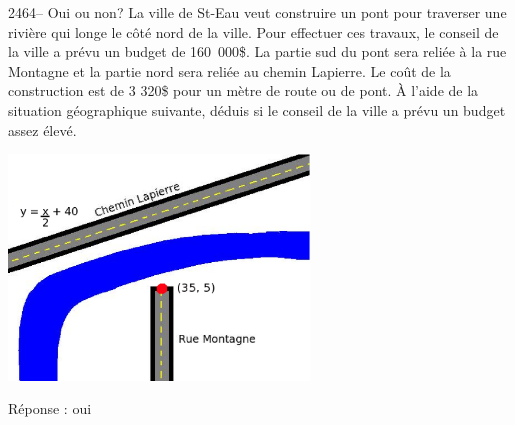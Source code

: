 \documentclass[letterpaper, 12pt]{article}
\begin{document}
2464-- Oui ou non? La ville de St-Eau veut construire un pont pour traverser une rivi\`ere qui longe le c\^ot\'e nord de la ville. Pour effectuer ces travaux, le conseil de la ville a pr\'evu un budget de \mbox{160 000\$}. La partie sud du pont sera reli\'ee \`a la rue Montagne et la partie nord sera reli\'ee au chemin Lapierre. Le co\^ut de la construction est de 3 320\$ pour un m\`etre de route ou de pont. \`A l'aide de la situation g\'eographique suivante, d\'eduis si le conseil de la ville a pr\'evu un budget assez \'elev\'e.\\
\begin{center}
 \includegraphics[width=8cm,bb=14 14 553 418]{Q2464.eps}
\end{center}

R\'eponse : oui\\
\end{document}
